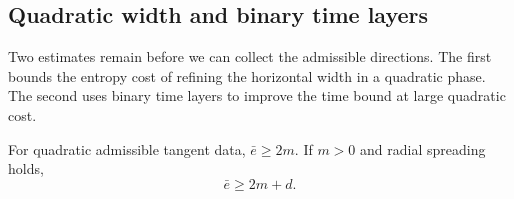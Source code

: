 \subsection{Quadratic width and binary time layers}

Two estimates remain before we can collect the admissible directions.
The first bounds the entropy cost of refining the horizontal width in a
quadratic phase. The second uses binary time layers to improve the time
bound at large quadratic cost.

\begin{proposition}\label{int:horizontal-width}
For quadratic admissible tangent data,
$\bar e\geq2m$. If $m>0$ and radial spreading holds,
\begin{equation}
 \bar e\geq2m+d.
 \tag{e-q}\label{eq:e-q}
\end{equation}
\end{proposition}

